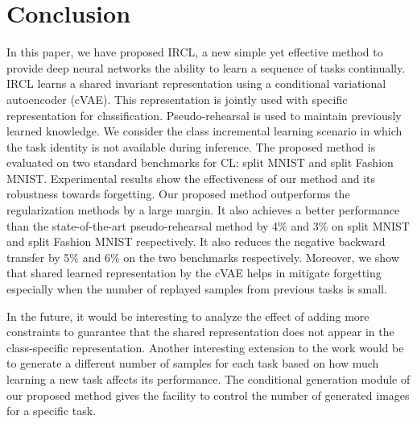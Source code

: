 \documentclass[letterpaper]{article} %
\begin{document}
\section{Conclusion}
In this paper, we have proposed IRCL, a new simple yet effective method to provide deep neural networks the ability to learn a sequence of tasks continually. IRCL learns a shared invariant representation using a conditional variational autoencoder (cVAE). This representation is jointly used with specific representation for classification. Pseudo-rehearsal is used to maintain previously learned knowledge. We consider the class incremental learning scenario in which the task identity is not available during inference. The proposed method is evaluated on two standard benchmarks for CL: split MNIST and split Fashion MNIST. Experimental results show the effectiveness of our method and its robustness towards forgetting. Our proposed method outperforms the regularization methods by a large margin. It also achieves a better performance than the state-of-the-art pseudo-rehearsal method by 4\% and 3\% on split MNIST and split Fashion MNIST respectively. It also reduces the negative backward transfer by 5\%  and 6\% on the two benchmarks respectively. 
Moreover, we show that shared learned representation by the cVAE helps in mitigate forgetting especially when the number of replayed samples from previous tasks is small. 

In the future, it would be interesting to analyze the effect of adding more constraints to guarantee that the shared representation does not appear in the class-specific representation. Another interesting extension to the work would be to generate a different number of samples for each task based on how much learning a new task affects its performance. The conditional generation module of our proposed method gives the facility to control the number of generated images for a specific task.

\balance

\end{document}
